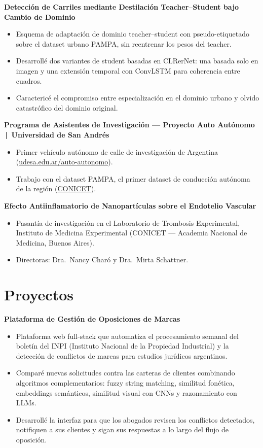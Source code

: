 \documentclass[a4paper,11pt]{article}
\begin{document}
\textbf{Detección de Carriles mediante Destilación Teacher--Student bajo Cambio de Dominio}
\begin{itemize}
    \item Esquema de adaptación de dominio teacher--student con pseudo-etiquetado sobre el dataset urbano PAMPA, sin reentrenar los pesos del teacher.
    \item Desarrollé dos variantes de student basadas en CLRerNet: una basada solo en imagen y una extensión temporal con ConvLSTM para coherencia entre cuadros.
    \item Caractericé el compromiso entre especialización en el dominio urbano y olvido catastrófico del dominio original.
\end{itemize}

\textbf{Programa de Asistentes de Investigación --- Proyecto Auto Autónomo \,|\, Universidad de San Andrés}
\begin{itemize}
    \item Primer vehículo autónomo de calle de investigación de Argentina (\href{https://udesa.edu.ar/auto-autonomo}{udesa.edu.ar/auto-autonomo}).
    \item Trabajo con el dataset PAMPA, el primer dataset de conducción autónoma de la región (\href{https://ri.conicet.gov.ar/handle/11336/242774}{CONICET}).
\end{itemize}

\textbf{Efecto Antiinflamatorio de Nanopartículas sobre el Endotelio Vascular}
\begin{itemize}
    \item Pasantía de investigación en el Laboratorio de Trombosis Experimental, Instituto de Medicina Experimental (CONICET --- Academia Nacional de Medicina, Buenos Aires).
    \item Directoras: Dra.\ Nancy Charó y Dra.\ Mirta Schattner.
\end{itemize}

\section*{Proyectos}

\textbf{Plataforma de Gestión de Oposiciones de Marcas}
\begin{itemize}
    \item Plataforma web full-stack que automatiza el procesamiento semanal del boletín del INPI (Instituto Nacional de la Propiedad Industrial) y la detección de conflictos de marcas para estudios jurídicos argentinos.
    \item Comparé nuevas solicitudes contra las carteras de clientes combinando algoritmos complementarios: fuzzy string matching, similitud fonética, embeddings semánticos, similitud visual con CNNs y razonamiento con LLMs.
    \item Desarrollé la interfaz para que los abogados revisen los conflictos detectados, notifiquen a sus clientes y sigan sus respuestas a lo largo del flujo de oposición.
\end{itemize}
\end{document}
